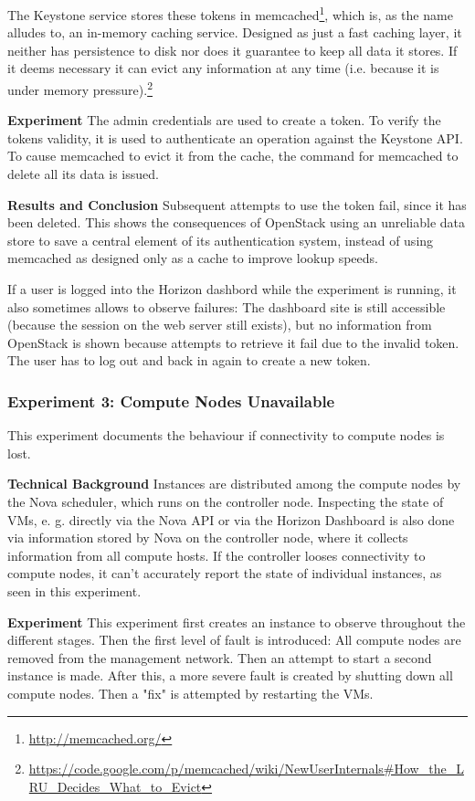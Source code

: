 The Keystone service stores these tokens in memcached\footnote{\url{http://memcached.org/}}, which is, as the name alludes to, an in-memory caching service. Designed as just a fast caching layer, it neither has persistence to disk nor does it guarantee to keep all data it stores. If it deems necessary it can evict any information at any time (i.e. because it is under memory pressure).\footnote{\url{https://code.google.com/p/memcached/wiki/NewUserInternals\#How_the_LRU_Decides_What_to_Evict}}

\textbf{Experiment}
The admin credentials are used to create a token. To verify the tokens validity, it is used to authenticate an operation against the Keystone API. To cause memcached to evict it from the cache, the command for memcached to delete all its data is issued. 

\textbf{Results and Conclusion}
Subsequent attempts to use the token fail, since it has been deleted. This shows the consequences of OpenStack using an unreliable data store to save a central element of its authentication system, instead of using memcached as designed only as a cache to improve lookup speeds. 

If a user is  logged into the Horizon dashbord while the experiment is running, it also sometimes allows to observe failures: The dashboard site is still accessible (because the session on the web server still exists), but no information from OpenStack is shown because attempts to retrieve it fail due to the invalid token. The user has to log out and back in again to create a new token. 

\subsubsection{Experiment 3: Compute Nodes Unavailable}
This experiment documents the behaviour if connectivity to compute nodes is lost.

\textbf{Technical Background}
Instances are distributed among the compute nodes by the Nova scheduler, which runs on the controller node. Inspecting the state of VMs, e. g. directly via the Nova API or via the Horizon Dashboard is also done via information stored by Nova on the controller node, where it collects information from all compute hosts.
If the controller looses connectivity to compute nodes, it can't accurately report the state of individual instances, as seen in this experiment. 

\textbf{Experiment}
This experiment first creates an instance to observe throughout the different stages. Then the first level of fault is introduced: All compute nodes are removed from the management network. Then an attempt to start a second instance is made. After this, a more severe fault is created by shutting down all compute nodes. Then a "fix" is attempted by restarting the VMs.

